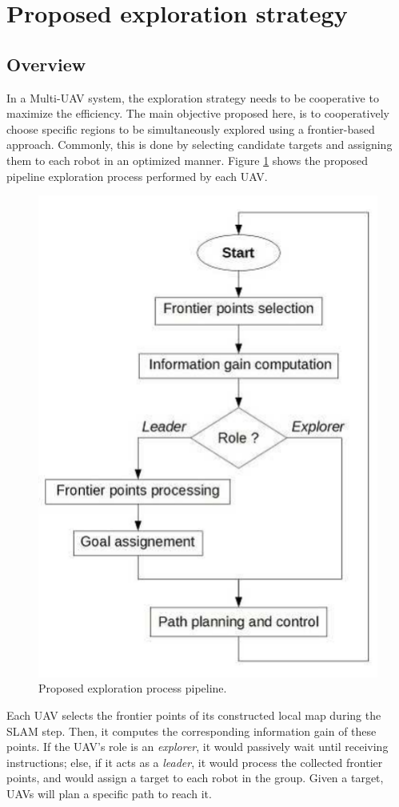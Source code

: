 \documentclass[11pt,openany]{book}
\begin{document}
\section{Proposed exploration strategy}
\subsection{Overview}
In a Multi-UAV system, the exploration strategy needs to be cooperative to maximize the eﬃciency. The main objective proposed here, is to cooperatively choose specific regions to be simultaneously explored using a frontier-based approach. Commonly, this is done by selecting candidate targets and assigning them to each robot in an optimized manner. Figure \ref{fig:3.1} shows the proposed pipeline exploration process performed by each UAV.
\begin{figure}[H]
    \centering
    \includegraphics[scale=0.6]{assets/3_1.png}
    \caption{Proposed exploration process pipeline.}
    \label{fig:3.1}
\end{figure}
Each UAV selects the frontier points of its constructed local map during the SLAM step. Then, it computes the corresponding information gain of these points. If the UAV’s role is an \textit{explorer}, it would passively wait until receiving instructions; else, if it acts as a \textit{leader}, it would process the collected frontier points, and would assign a target to each robot in the group. Given a target, UAVs will plan a specific path to reach it.\\\\
\end{document}
